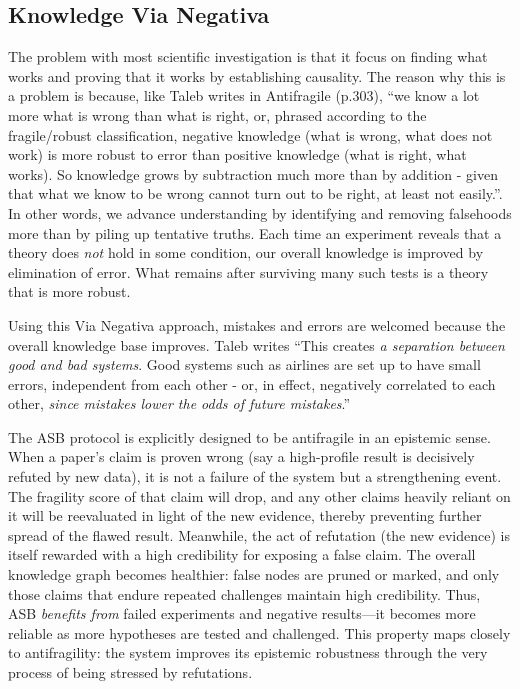 \subsection{Knowledge Via Negativa}
The problem with most scientific investigation is that it focus on finding what works and proving that it works by establishing causality. The reason why this is a problem is because, like Taleb writes in Antifragile \cite{Taleb2012}(p.303), ``we know a lot more what is wrong than what is right, or, phrased according to the fragile/robust classification, negative knowledge (what is wrong, what does not work) is more robust to error than positive knowledge (what is right, what works). So knowledge grows by subtraction much more than by addition - given that what we know to be wrong cannot turn out to be right, at least not easily.''. In other words, we advance understanding by identifying and removing falsehoods more than by piling up tentative truths. Each time an experiment reveals that a theory does \emph{not} hold in some condition, our overall knowledge is improved by elimination of error. What remains after surviving many such tests is a theory that is more robust.

Using this Via Negativa approach, mistakes and errors are welcomed because the overall knowledge base improves. Taleb writes ``This creates \emph{a separation between good and bad systems}. Good systems such as airlines are set up to have small errors, independent from each other - or, in effect, negatively correlated to each other, \emph{since mistakes lower the odds of future mistakes}.''\cite{Taleb2012}

The ASB protocol is explicitly designed to be antifragile in an epistemic sense. When a paper's claim is proven wrong (say a high-profile result is decisively refuted by new data), it is not a failure of the system but a strengthening event. The fragility score of that claim will drop, and any other claims heavily reliant on it will be reevaluated in light of the new evidence, thereby preventing further spread of the flawed result. 
Meanwhile, the act of refutation (the new evidence) is itself rewarded with a high credibility for exposing a false claim. The overall knowledge graph becomes healthier: false nodes are pruned or marked, and only those claims that endure repeated challenges maintain high credibility. 
Thus, ASB \emph{benefits from} failed experiments and negative results---it becomes more reliable as more hypotheses are tested and challenged. This property maps closely to antifragility: the system improves its epistemic robustness through the very process of being stressed by refutations.